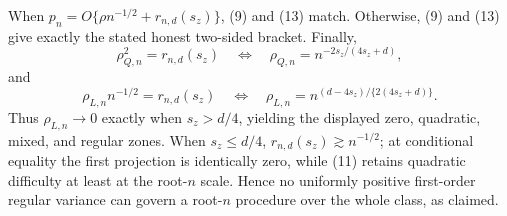 When \(p_n=O\{\rho n^{-1/2}+r_{n,d}(s_z)\}\), (9) and (13) match.  Otherwise, (9) and (13) give exactly the stated honest two-sided bracket.  Finally,
\[
\rho_{Q,n}^2=r_{n,d}(s_z)
\quad\Longleftrightarrow\quad
\rho_{Q,n}=n^{-2s_z/(4s_z+d)},
\]
and
\[
\rho_{L,n}n^{-1/2}=r_{n,d}(s_z)
\quad\Longleftrightarrow\quad
\rho_{L,n}=n^{(d-4s_z)/\{2(4s_z+d)\}}.
\]
Thus \(\rho_{L,n}\to0\) exactly when \(s_z>d/4\), yielding the displayed zero, quadratic, mixed, and regular zones.  When \(s_z\le d/4\), \(r_{n,d}(s_z)\gtrsim n^{-1/2}\); at conditional equality the first projection is identically zero, while (11) retains quadratic difficulty at least at the root-\(n\) scale.  Hence no uniformly positive first-order regular variance can govern a root-\(n\) procedure over the whole class, as claimed.